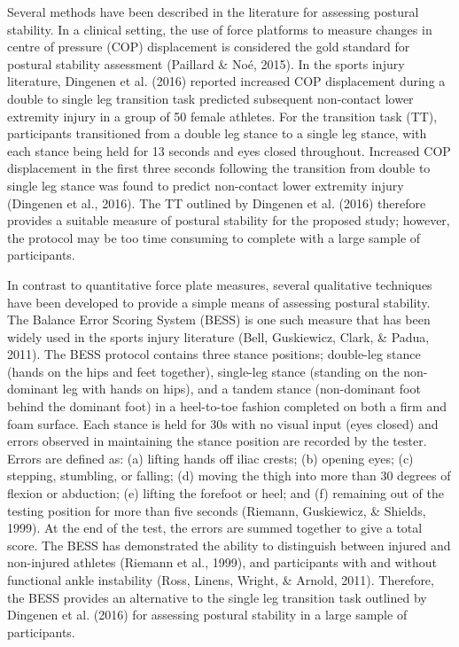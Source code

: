 \documentclass[man,floatsintext]{apa6}
\begin{document}
Several methods have been described in the literature for assessing postural stability.
In a clinical setting, the use of force platforms to measure changes in centre of pressure (COP) displacement is considered the gold standard for postural stability assessment (Paillard \& Noé, 2015).
In the sports injury literature, Dingenen et al. (2016) reported increased COP displacement during a double to single leg transition task predicted subsequent non-contact lower extremity injury in a group of 50 female athletes.
For the transition task (TT), participants transitioned from a double leg stance to a single leg stance, with each stance being held for 13 seconds and eyes closed throughout.
Increased COP displacement in the first three seconds following the transition from double to single leg stance was found to predict non-contact lower extremity injury (Dingenen et al., 2016).
The TT outlined by Dingenen et al. (2016) therefore provides a suitable measure of postural stability for the proposed study; however, the protocol may be too time consuming to complete with a large sample of participants.

In contrast to quantitative force plate measures, several qualitative techniques have been developed to provide a simple means of assessing postural stability.
The Balance Error Scoring System (BESS) is one such measure that has been widely used in the sports injury literature (Bell, Guskiewicz, Clark, \& Padua, 2011).
The BESS protocol contains three stance positions; double-leg stance (hands on the hips and feet together), single-leg stance (standing on the non-dominant leg with hands on hips), and a tandem stance (non-dominant foot behind the dominant foot) in a heel-to-toe fashion completed on both a firm and foam surface.
Each stance is held for 30s with no visual input (eyes closed) and errors observed in maintaining the stance position are recorded by the tester.
Errors are defined as: (a) lifting hands off iliac crests; (b) opening eyes; (c) stepping, stumbling, or falling; (d) moving the thigh into more than 30 degrees of flexion or abduction; (e) lifting the forefoot or heel; and (f) remaining out of the testing position for more than five seconds (Riemann, Guskiewicz, \& Shields, 1999).
At the end of the test, the errors are summed together to give a total score.
The BESS has demonstrated the ability to distinguish between injured and non-injured athletes (Riemann et al., 1999), and participants with and without functional ankle instability (Ross, Linens, Wright, \& Arnold, 2011).
Therefore, the BESS provides an alternative to the single leg transition task outlined by Dingenen et al. (2016) for assessing postural stability in a large sample of participants.
\end{document}
